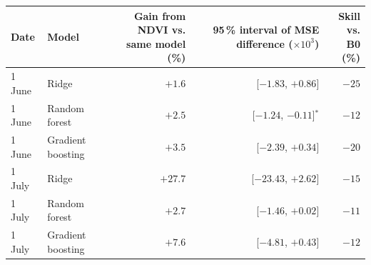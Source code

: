 \begin{tabular}{llrrr}
\toprule
Date & Model & \shortstack{Gain from NDVI vs.\\same model (\%)} & \shortstack{95\,\% interval of MSE\\difference ($\times 10^3$)} & \shortstack{Skill vs.\\B0 (\%)} \\
\midrule
1 June & Ridge & $+1.6$ & [$-1.83$, $+0.86$] & $-25$ \\
1 June & Random forest & $+2.5$ & [$-1.24$, $-0.11$]$^*$ & $-12$ \\
1 June & Gradient boosting & $+3.5$ & [$-2.39$, $+0.34$] & $-20$ \\
1 July & Ridge & $+27.7$ & [$-23.43$, $+2.62$] & $-15$ \\
1 July & Random forest & $+2.7$ & [$-1.46$, $+0.02$] & $-11$ \\
1 July & Gradient boosting & $+7.6$ & [$-4.81$, $+0.43$] & $-12$ \\
\bottomrule
\end{tabular}
